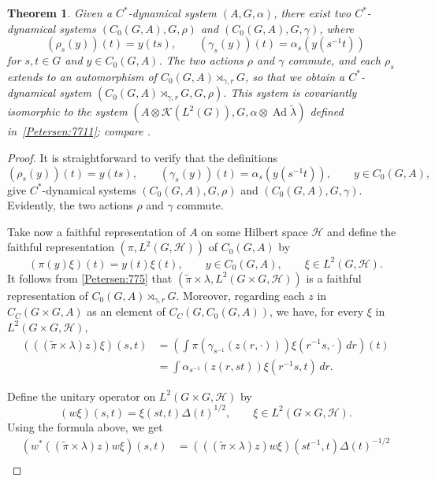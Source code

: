 \documentclass{book}
\newtheorem{theorem}[definition]{Theorem}
\begin{document}
\begin{theorem}\label{Petersen:7712}
  Given a \(C^*\)-dynamical system \((A, G, \alpha)\), there exist two \(C^*\)-dynamical systems 
  \((C_0(G, A), G, \rho)\) and \((C_0(G, A), G, \gamma)\), where
  \[
    (\rho_s(y))(t)=y(ts),
    \qquad
    (\gamma_s(y))(t)=\alpha_s(y(s^{-1}t))
  \]
  for \(s,t\in G\) and \(y\in C_0(G,A)\). The two actions \(\rho\) and \(\gamma\) commute, and each \(\rho_s\) extends to an automorphism of \(C_0(G,A)\rtimes_{\gamma,r}G\),
  so that we obtain a \(C^*\)-dynamical system \((C_0(G,A)\rtimes_{\gamma,r}G, G, \rho)\).
  This system is covariantly isomorphic to the system
  \((A\otimes \mathcal{K}(L^2(G)), G, \alpha\otimes\operatorname{Ad}\tilde{\lambda})\)
  defined in~\ref{Petersen:7711}; compare \cite[Section 7.1]{Williams2007}.
\end{theorem}
\begin{proof}
  It is straightforward to verify that the definitions
  \[
    (\rho_s(y))(t)=y(ts),\qquad (\gamma_s(y))(t)=\alpha_s(y(s^{-1}t)),\qquad y\in C_0(G, A),
  \]
  give \(C^*\)-dynamical systems \((C_0(G, A), G, \rho)\) and \((C_0(G, A), G, \gamma)\). Evidently, the two actions \(
  \rho\) and \(\gamma\) commute.\par
  Take now a faithful representation of \(A\) on some Hilbert space \(\mathcal{H}\) and define the faithful representation \((\pi, L^2(G, \mathcal{H}))\) of \(C_0(G, A)\) by
  \[
    (\pi(y)\xi)(t)=y(t)\xi(t),\qquad y\in C_0(G,A),\qquad \xi\in L^2(G, \mathcal{H}).
  \]
  It follows from \ref{Petersen:775} that \((\tilde{\pi}\times\lambda, L^2(G\times G, \mathcal{H}))\) is a faithful representation of \(C_0(G,A)\rtimes_{\gamma,r}G\).
  Moreover, regarding each \(z\) in \(C_C(G\times G, A)\) as an element of \(C_C(G, C_0(G, A))\), we have, for every \(\xi\) in \(L^2(G\times G, \mathcal{H})\),
  \begin{align*}
    (((\tilde{\pi}\times\lambda)z)\xi)(s,t)&=\left(\int\pi(\gamma_{s^{-1}}(z(r,\cdot)))\xi(r^{-1}s,\cdot)\,dr\right)(t)\\
    &=\int\alpha_{s^{-1}}(z(r,st))\xi(r^{-1}s,t)\,dr.
  \end{align*}\par
  Define the unitary operator on \(L^2(G\times G, \mathcal{H})\) by
  \[
    (w\xi)(s,t)=\xi(st,t){\Delta(t)}^{1/2}, \qquad \xi\in L^2(G\times G, \mathcal{H}).
  \]
  Using the formula above, we get
  \begin{align*}
    (w^*((\tilde{\pi}\times\lambda)z)w\xi)(s,t)&=(((\tilde{\pi}\times\lambda)z)w\xi)(s t^{-1},t){\Delta(t)}^{-1/2}\\

\end{align*}
\end{proof}
\end{document}
